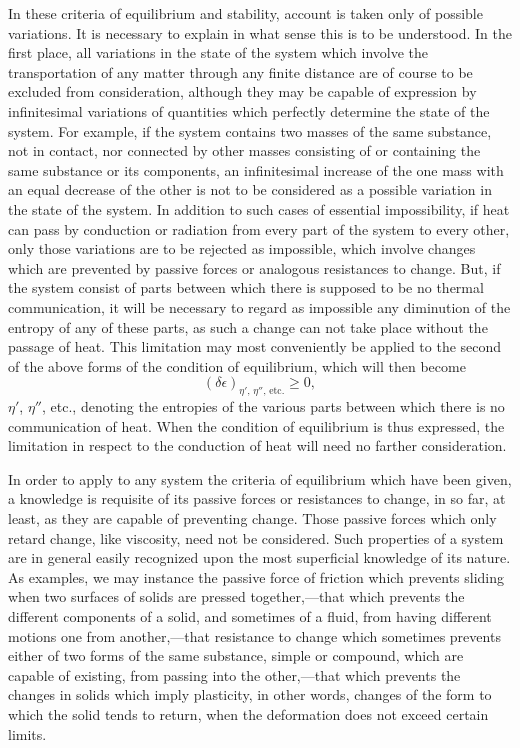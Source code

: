 \documentclass[11pt]{article}
\newcommand{\eps}{\epsilon}
\begin{document}
In these criteria of equilibrium and stability, account is taken only of possible variations. It is necessary to explain in what sense this is to be understood. In the first place, all variations in the state of the system which involve the transportation of any matter through any finite distance are of course to be excluded from consideration, although they may be capable of expression by infinitesimal variations of quantities which perfectly determine the state of the system. For example, if the system contains two masses of the same substance, not in contact, nor connected by other masses consisting of or containing the same substance or its components, an infinitesimal increase of the one mass with an equal decrease of the other is not to be considered as a possible variation in the state of the system. In addition to such cases of essential impossibility, if heat can pass by conduction or radiation from every part of the system to every other, only those variations are to be rejected as impossible, which involve changes which are prevented by passive forces or analogous resistances to change. But, if the system consist of parts between which there is supposed to be no thermal communication, it will be necessary to regard as impossible any diminution of the entropy of any of these parts, as such a change can not take place without the passage of heat. This limitation may most conveniently be applied to the second of the above forms of the condition of equilibrium, which will then become
\begin{equation}
(\delta\eps)_{\eta',\,\eta'',\,\mathrm{etc.}}\geq 0,
\end{equation}
\(\eta'\), \(\eta''\), etc., denoting the entropies of the various parts between which there is no communication of heat. When the condition of equilibrium is thus expressed, the limitation in respect to the conduction of heat will need no farther consideration.

In order to apply to any system the criteria of equilibrium which have been given, a knowledge is requisite of its passive forces or resistances to change, in so far, at least, as they are capable of preventing change. Those passive forces which only retard change, like viscosity, need not be considered. Such properties of a system are in general easily recognized upon the most superficial knowledge of its nature. As examples, we may instance the passive force of friction which prevents sliding when two surfaces of solids are pressed together,—that which prevents the different components of a solid, and sometimes of a fluid, from having different motions one from another,—that resistance to change which sometimes prevents either of two forms of the same substance, simple or compound, which are capable of existing, from passing into the other,—that which prevents the changes in solids which imply plasticity, in other words, changes of the form to which the solid tends to return, when the deformation does not exceed certain limits.
\end{document}

